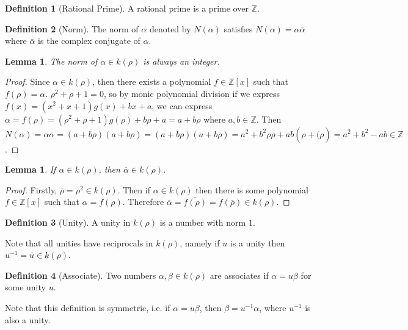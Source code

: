 \documentclass{article}
\newtheorem{lemma}[theorem]{Lemma}
\theoremstyle{definition}
\newtheorem{definition}{Definition}[section]
\theoremstyle{definition}
\theoremstyle{definition}
\begin{document}
\begin{definition} [Rational Prime]
    A rational prime is a prime over $\mathbb{Z}$. 
\end{definition}

\begin{definition} [Norm]
    The norm of $\alpha$ denoted by $N(\alpha)$ satisfies $N(\alpha)=\alpha\bar{\alpha}$ where $\bar{\alpha}$ is the complex conjugate of $\alpha$.
\end{definition}

\begin{lemma}
    The norm of $\alpha\in k(\rho)$ is always an integer.
\end{lemma}
\begin{proof}
Since $\alpha\in k(\rho)$, then there exists a polynomial $f\in\mathbb Z[x]$ such that $f(\rho)=\alpha$. $\rho^2+\rho+1=0$, so by monic polynomial division if we express $f(x)=(x^2+x+1)g(x)+bx+a$, we can express $\alpha=f(\rho)=(\rho^2+\rho+1)g(\rho)+b\rho+a=a+b\rho$ where $a,b\in\mathbb Z$. Then $N(\alpha)=\alpha\overline{\alpha}=(a+b\rho)\overline{(a+b\rho)}=(a+b\rho)(a+b\overline\rho)=a^2+b^2\rho\overline\rho+ab(\rho+\overline(\rho)=a^2+b^2-ab\in\mathbb Z$.
\end{proof}

\begin{lemma}
    If $\alpha\in k(\rho)$, then $\overline \alpha\in k(\rho)$.
\end{lemma}
\begin{proof}
    Firstly, $\overline\rho=\rho^2\in k(\rho)$. Then if $\alpha\in k(\rho)$ then there is some polynomial $f\in\mathbb Z[x]$ such that $\alpha =f(\rho)$. Therefore $\overline\alpha=\overline{f(\rho)}=f(\overline\rho)\in k(\rho)$.
\end{proof}

\begin{definition} [Unity]
    A unity in $k(\rho)$ is a number with norm $1$.
\end{definition}

Note that all unities have reciprocals in $k(\rho)$, namely if $u$ is a unity then $u^{-1}=\overline{u}\in k(\rho)$.
    
\begin{definition} [Associate]
    Two numbers $\alpha,\beta\in k(\rho)$ are associates if $\alpha=u\beta$ for some unity $u$.
\end{definition}
Note that this definition is symmetric, i.e. if $\alpha=u\beta$, then $\beta=u^{-1}\alpha$, where $u^{-1}$ is also a unity.
\end{document}
